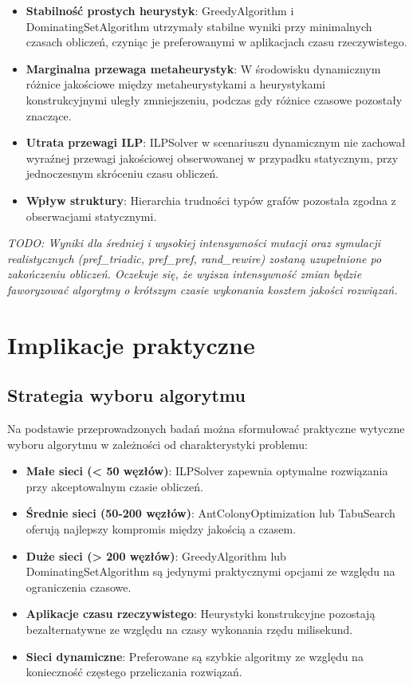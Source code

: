 \begin{itemize}
\item \textbf{Stabilność prostych heurystyk}: GreedyAlgorithm i DominatingSetAlgorithm utrzymały stabilne wyniki przy minimalnych czasach obliczeń, czyniąc je preferowanymi w aplikacjach czasu rzeczywistego.

\item \textbf{Marginalna przewaga metaheurystyk}: W środowisku dynamicznym różnice jakościowe między metaheurystykami a heurystykami konstrukcyjnymi uległy zmniejszeniu, podczas gdy różnice czasowe pozostały znaczące.

\item \textbf{Utrata przewagi ILP}: ILPSolver w scenariuszu dynamicznym nie zachował wyraźnej przewagi jakościowej obserwowanej w przypadku statycznym, przy jednoczesnym skróceniu czasu obliczeń.

\item \textbf{Wpływ struktury}: Hierarchia trudności typów grafów pozostała zgodna z obserwacjami statycznymi.
\end{itemize}

\emph{TODO: Wyniki dla średniej i wysokiej intensywności mutacji oraz symulacji realistycznych (pref\_triadic, pref\_pref, rand\_rewire) zostaną uzupełnione po zakończeniu obliczeń. Oczekuje się, że wyższa intensywność zmian będzie faworyzować algorytmy o krótszym czasie wykonania kosztem jakości rozwiązań.}

\section{Implikacje praktyczne}

\subsection{Strategia wyboru algorytmu}

Na podstawie przeprowadzonych badań można sformułować praktyczne wytyczne wyboru algorytmu w zależności od charakterystyki problemu:

\begin{itemize}
\item \textbf{Małe sieci (< 50 węzłów)}: ILPSolver zapewnia optymalne rozwiązania przy akceptowalnym czasie obliczeń.

\item \textbf{Średnie sieci (50-200 węzłów)}: AntColonyOptimization lub TabuSearch oferują najlepszy kompromis między jakością a czasem.

\item \textbf{Duże sieci (> 200 węzłów)}: GreedyAlgorithm lub DominatingSetAlgorithm są jedynymi praktycznymi opcjami ze względu na ograniczenia czasowe.

\item \textbf{Aplikacje czasu rzeczywistego}: Heurystyki konstrukcyjne pozostają bezalternatywne ze względu na czasy wykonania rzędu milisekund.

\item \textbf{Sieci dynamiczne}: Preferowane są szybkie algoritmy ze względu na konieczność częstego przeliczania rozwiązań.
\end{itemize}

